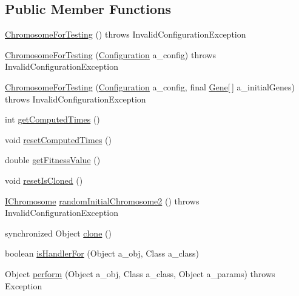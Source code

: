\subsection*{Public Member Functions}
\begin{DoxyCompactItemize}
\item 
\hyperlink{classorg_1_1jgap_1_1_chromosome_for_testing_aa30c6d1e2e69ce1978d97c2540aa9ed4}{Chromosome\-For\-Testing} ()  throws Invalid\-Configuration\-Exception 
\item 
\hyperlink{classorg_1_1jgap_1_1_chromosome_for_testing_a505b60c5fe34d7540a878c67d7a221f1}{Chromosome\-For\-Testing} (\hyperlink{classorg_1_1jgap_1_1_configuration}{Configuration} a\-\_\-config)  throws Invalid\-Configuration\-Exception 
\item 
\hyperlink{classorg_1_1jgap_1_1_chromosome_for_testing_a3c91e8c54303339456cb83662d7c1c44}{Chromosome\-For\-Testing} (\hyperlink{classorg_1_1jgap_1_1_configuration}{Configuration} a\-\_\-config, final \hyperlink{interfaceorg_1_1jgap_1_1_gene}{Gene}\mbox{[}$\,$\mbox{]} a\-\_\-initial\-Genes)  throws Invalid\-Configuration\-Exception 
\item 
int \hyperlink{classorg_1_1jgap_1_1_chromosome_for_testing_a09badc9a3c7e94041057df27c3e4c5c6}{get\-Computed\-Times} ()
\item 
void \hyperlink{classorg_1_1jgap_1_1_chromosome_for_testing_ad62fc0d30ee4773a96b91fb1a7c5e4cc}{reset\-Computed\-Times} ()
\item 
double \hyperlink{classorg_1_1jgap_1_1_chromosome_for_testing_af25dacbcb89fed18007d55f1fde951b4}{get\-Fitness\-Value} ()
\item 
void \hyperlink{classorg_1_1jgap_1_1_chromosome_for_testing_a7442bca45bb55a07fa7bc9a0dab795c9}{reset\-Is\-Cloned} ()
\item 
\hyperlink{interfaceorg_1_1jgap_1_1_i_chromosome}{I\-Chromosome} \hyperlink{classorg_1_1jgap_1_1_chromosome_for_testing_aa186eea2900ad70d989ae91f334a4c9c}{random\-Initial\-Chromosome2} ()  throws Invalid\-Configuration\-Exception 
\item 
synchronized Object \hyperlink{classorg_1_1jgap_1_1_chromosome_for_testing_acfcef639c3443fde7d324164050e3e19}{clone} ()
\item 
boolean \hyperlink{classorg_1_1jgap_1_1_chromosome_for_testing_a05fb9ea1e9bcdb28eef5ab4ee7f22f94}{is\-Handler\-For} (Object a\-\_\-obj, Class a\-\_\-class)
\item 
Object \hyperlink{classorg_1_1jgap_1_1_chromosome_for_testing_a89f5971800a63faa175bed4d141aa932}{perform} (Object a\-\_\-obj, Class a\-\_\-class, Object a\-\_\-params)  throws Exception 
\end{DoxyCompactItemize}
